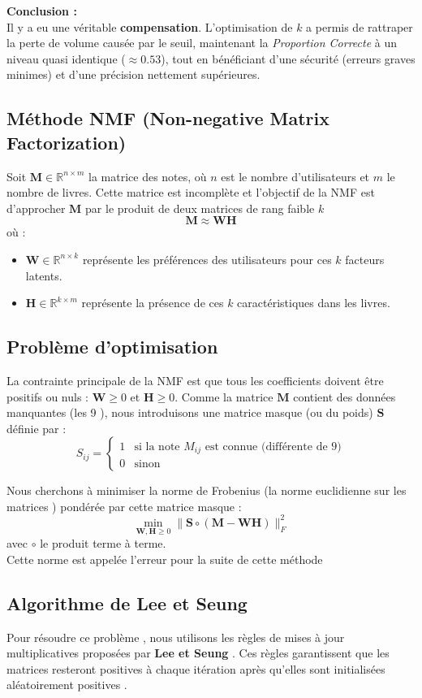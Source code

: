 \documentclass[11pt,a4paper]{article}
\newcommand{\R}{\mathbb R}
\newcommand{\bH}{\boldsymbol{H}}
\newcommand{\bM}{\boldsymbol{M}}
\newcommand{\bW}{\boldsymbol{W}}
\newcommand{\bS}{\boldsymbol{S}}
\begin{document}
\textbf{Conclusion :}
\\
Il y a eu une véritable \textbf{compensation}. L'optimisation de $k$ a permis de rattraper la perte de volume causée par le seuil, maintenant la \textit{Proportion Correcte} à un niveau quasi identique ($\approx 0.53$), tout en bénéficiant d'une sécurité (erreurs graves minimes) et d'une précision nettement supérieures.
\subsection{Méthode NMF (Non-negative Matrix Factorization)}
Soit $\bM \in \R^{n \times m}$ la matrice des notes, où $n$ est le nombre d'utilisateurs et $m$ le nombre de livres. Cette matrice est incomplète et l'objectif de la NMF est d'approcher $\bM$ par le produit de deux matrices de rang faible $k$ 
$$ \bM \approx \bW \bH $$
où :
\begin{itemize}
    \item $\bW \in \R^{n \times k}$ représente les préférences des utilisateurs pour ces $k$ facteurs latents.
    \item $\bH \in \R^{k \times m}$ représente la présence de ces $k$ caractéristiques dans les livres.
\end{itemize}
\subsection{Problème d'optimisation}
La contrainte principale de la NMF est que tous les coefficients doivent être positifs ou nuls : $\bW \geq 0$ et $\bH \geq 0$.
Comme la matrice $\bM$ contient des données manquantes (les 9 ), nous introduisons une matrice masque (ou du poids)  $\bS$ définie par :
$$
S_{ij} = \begin{cases} 
1 & \text{si la note } M_{ij} \text{ est connue (différente de 9)} \\
0 & \text{sinon}
\end{cases}
$$

Nous cherchons à minimiser la norme de Frobenius (la norme euclidienne sur les matrices ) pondérée par cette matrice masque :
$$ \min_{\bW, \bH \geq 0} \| \bS \circ (\bM - \bW\bH) \|_F^2 $$
avec $\circ$ le produit terme à terme. \\
Cette norme est appelée l'erreur pour la suite de cette méthode 

\subsection{Algorithme de Lee et Seung}
Pour résoudre ce problème , nous utilisons les règles de mises à jour multiplicatives proposées par \textbf{Lee et Seung} \citep{NIPS2000_f9d11525}. Ces règles garantissent que les matrices resteront positives à chaque itération après qu'elles sont initialisées aléatoirement positives .
\end{document}
